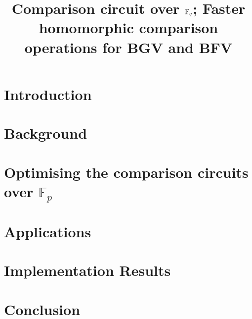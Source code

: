 \documentclass{llncs}
\title{Comparison circuit over $\mathbb{F}_q$; Faster homomorphic comparison operations for BGV and BFV}
\date{}
\author{}
\begin{document}
\maketitle

\section{Introduction}
\label{sec:introduction}


\section{Background}
\label{sec:background}


% 

\section{Optimising the comparison circuits over $\mathbb{F}_p$}
\label{sec:comparison-circuit}



\section{Applications}
\label{sec:applications}


\section{Implementation Results}
\label{sec:impl-results}


% 

\section{Conclusion}




\end{document}
